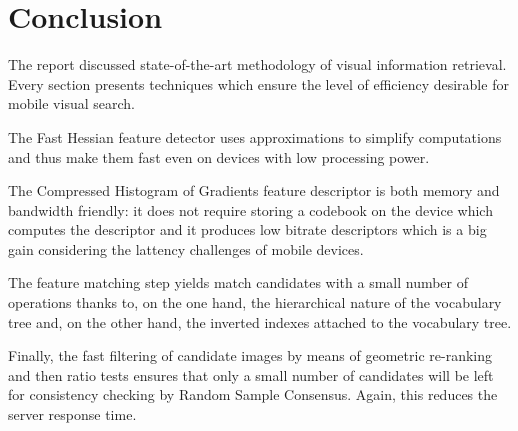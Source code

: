 \section{Conclusion}

The report discussed state-of-the-art methodology of visual information retrieval. Every section presents techniques which ensure the level of efficiency desirable for mobile visual search.

The Fast Hessian feature detector uses approximations to simplify computations and thus make them fast even on devices with low processing power.

The Compressed Histogram of Gradients feature descriptor is both memory and bandwidth friendly: it does not require storing a codebook on the device which computes the descriptor and it produces low bitrate descriptors which is a big gain considering the lattency challenges of mobile devices.

The feature matching step yields match candidates with a small number of operations thanks to, on the one hand, the hierarchical nature of the vocabulary tree and, on the other hand, the inverted indexes attached to the vocabulary tree.

Finally, the fast filtering of candidate images by means of geometric re-ranking and then ratio tests ensures that only a small number of candidates will be left for consistency checking by Random Sample Consensus. Again, this reduces the server response time.
